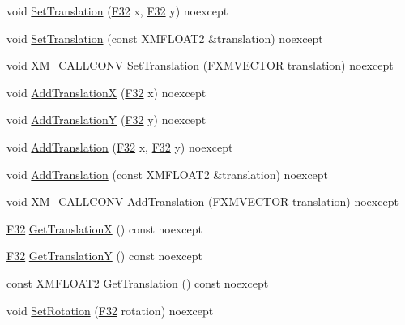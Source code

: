 \begin{DoxyCompactItemize}
\item 
void \hyperlink{classmage_1_1_texture_transform_aeda73ef35d04ceeb93f29b2e6a16274b}{Set\+Translation} (\hyperlink{namespacemage_aa97e833b45f06d60a0a9c4fc22ae02c0}{F32} x, \hyperlink{namespacemage_aa97e833b45f06d60a0a9c4fc22ae02c0}{F32} y) noexcept
\item 
void \hyperlink{classmage_1_1_texture_transform_a60b02d8f103e02d2f444997e61cb43c5}{Set\+Translation} (const X\+M\+F\+L\+O\+A\+T2 \&translation) noexcept
\item 
void X\+M\+\_\+\+C\+A\+L\+L\+C\+O\+NV \hyperlink{classmage_1_1_texture_transform_ad78b5f8482dd2a70ac7cde0aa5877f8c}{Set\+Translation} (F\+X\+M\+V\+E\+C\+T\+OR translation) noexcept
\item 
void \hyperlink{classmage_1_1_texture_transform_a17719b07810b45e0c669a6c6baff345d}{Add\+TranslationX} (\hyperlink{namespacemage_aa97e833b45f06d60a0a9c4fc22ae02c0}{F32} x) noexcept
\item 
void \hyperlink{classmage_1_1_texture_transform_a4c9463ef0b5f3730560093d03b31de15}{Add\+TranslationY} (\hyperlink{namespacemage_aa97e833b45f06d60a0a9c4fc22ae02c0}{F32} y) noexcept
\item 
void \hyperlink{classmage_1_1_texture_transform_a759b5363ddc7621b422ebdc90c9e17af}{Add\+Translation} (\hyperlink{namespacemage_aa97e833b45f06d60a0a9c4fc22ae02c0}{F32} x, \hyperlink{namespacemage_aa97e833b45f06d60a0a9c4fc22ae02c0}{F32} y) noexcept
\item 
void \hyperlink{classmage_1_1_texture_transform_a0d81ff50baf9e21c48b8ac643bca819a}{Add\+Translation} (const X\+M\+F\+L\+O\+A\+T2 \&translation) noexcept
\item 
void X\+M\+\_\+\+C\+A\+L\+L\+C\+O\+NV \hyperlink{classmage_1_1_texture_transform_aa8a4a8d6dec5386a9e83b0c48c30a90a}{Add\+Translation} (F\+X\+M\+V\+E\+C\+T\+OR translation) noexcept
\item 
\hyperlink{namespacemage_aa97e833b45f06d60a0a9c4fc22ae02c0}{F32} \hyperlink{classmage_1_1_texture_transform_a94d51c47a75024fadfd849fc45e5268d}{Get\+TranslationX} () const noexcept
\item 
\hyperlink{namespacemage_aa97e833b45f06d60a0a9c4fc22ae02c0}{F32} \hyperlink{classmage_1_1_texture_transform_a55bb63ee1f43af0208074fd876ba8d74}{Get\+TranslationY} () const noexcept
\item 
const X\+M\+F\+L\+O\+A\+T2 \hyperlink{classmage_1_1_texture_transform_afbb9d000cc5062982d5c20af4c885acb}{Get\+Translation} () const noexcept
\item 
void \hyperlink{classmage_1_1_texture_transform_aadf399acb4be8b747e71224a3e1f723c}{Set\+Rotation} (\hyperlink{namespacemage_aa97e833b45f06d60a0a9c4fc22ae02c0}{F32} rotation) noexcept

\end{DoxyCompactItemize}
